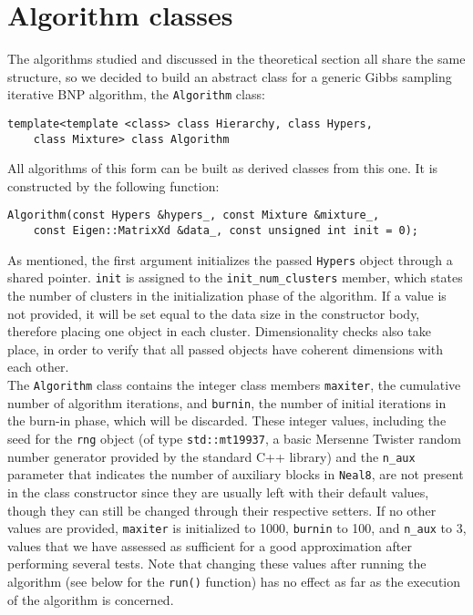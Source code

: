 \section{Algorithm classes}
The algorithms studied and discussed in the theoretical section all share the same structure, so we decided to build an abstract class for a generic Gibbs sampling iterative BNP algorithm, the \verb|Algorithm| class:
\begin{verbatim}
template<template <class> class Hierarchy, class Hypers,
    class Mixture> class Algorithm
\end{verbatim}
All algorithms of this form can be built as derived classes from this one.
It is constructed by the following function:
\begin{verbatim}
Algorithm(const Hypers &hypers_, const Mixture &mixture_,
    const Eigen::MatrixXd &data_, const unsigned int init = 0);
\end{verbatim}
As mentioned, the first argument initializes the passed \verb|Hypers| object through a shared pointer.
\verb|init| is assigned to the \verb|init_num_clusters| member, which states the number of clusters in the initialization phase of the algorithm.
If a value is not provided, it will be set equal to the data size in the constructor body, therefore placing one object in each cluster.
Dimensionality checks also take place, in order to verify that all passed objects have coherent dimensions with each other. \\
The \verb|Algorithm| class contains the integer class members \verb|maxiter|, the cumulative number of algorithm iterations, and \verb|burnin|, the number of initial iterations in the burn-in phase, which will be discarded.
These integer values, including the seed for the \verb|rng| object (of type \verb|std::mt19937|, a basic Mersenne Twister random number generator provided by the standard C++ library) and the \verb|n_aux| parameter that indicates the number of auxiliary blocks in \verb|Neal8|, are not present in the class constructor since they are usually left with their default values, though they can still be changed through their respective setters.
If no other values are provided, \verb|maxiter| is initialized to 1000, \verb|burnin| to 100, and \verb|n_aux| to 3, values that we have assessed as sufficient for a good approximation after performing several tests.
Note that changing these values after running the algorithm (see below for the \verb|run()| function) has no effect as far as the execution of the algorithm is concerned. \\
